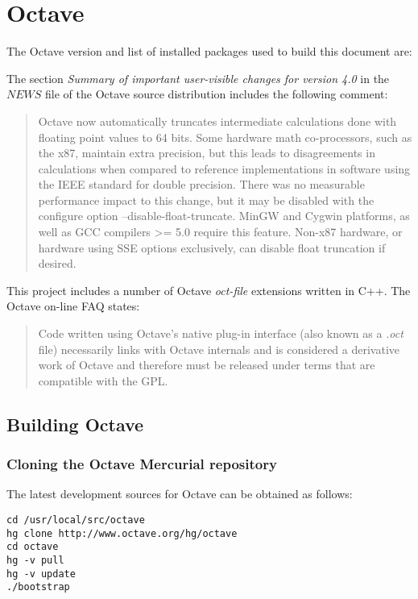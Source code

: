 \documentclass[a4paper,twoside,10pt,english]{report}
\begin{document}
\section*{Octave}
The Octave version and list of installed packages used to build this document
are:
\begin{small}

\end{small}

The section \emph{Summary of important user-visible changes for version 4.0} in 
the $NEWS$ file of the Octave source distribution includes the following comment:
\begin{quote}
  Octave now automatically truncates intermediate calculations done with
  floating point values to 64 bits.  Some hardware math co-processors, such
  as the x87, maintain extra precision, but this leads to disagreements in
  calculations when compared to reference implementations in software using
  the IEEE standard for double precision.  There was no measurable
  performance impact to this change, but it may be disabled with the
  configure option --disable-float-truncate.  MinGW and Cygwin platforms,
  as well as GCC compilers >= 5.0 require this feature.  Non-x87 hardware,
  or hardware using SSE options exclusively, can disable float truncation
  if desired.
\end{quote}

This project includes a number of Octave \emph{oct-file} extensions written in
C++. The Octave on-line FAQ states:
\begin{quote}
  Code written using Octave's native plug-in interface (also known as a
  \emph{.oct} file) necessarily links with Octave internals and is considered
  a derivative work of Octave and therefore must be released under terms that
  are compatible with the GPL.
\end{quote}

\subsection*{Building Octave}
\subsubsection*{Cloning the Octave Mercurial repository}
The latest development sources for Octave can be obtained as follows:
\begin{small}
\begin{verbatim}
cd /usr/local/src/octave
hg clone http://www.octave.org/hg/octave
cd octave
hg -v pull
hg -v update
./bootstrap
\end{verbatim}
\end{small}
\end{document}
